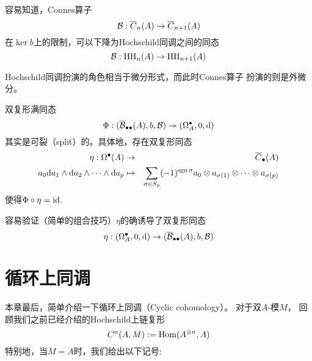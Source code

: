 











\begin{rem}
容易知道，Connes算子
$$\mathcal{B}:\overline{C}_n(A)\to\overline{C}_{n+1}(A)$$
在$\ker b$上的限制，可以下降为Hochschild同调之间的同态
$$\mathcal{B}:\operatorname{HH}_n(A)\to\operatorname{HH}_{n+1}(A)$$
\end{rem}
Hochschild同调扮演的角色相当于微分形式，而此时Connes算子
扮演的则是外微分。

\begin{rem}
双复形满同态
$$\Phi:(\overline{\mathcal{B}}_{\bullet\bullet}(A),b,\mathcal{B})\twoheadrightarrow
(\Omega^{\bullet}_A,0,\mathrm{d})
$$
其实是可裂（split）的。具体地，存在双复形同态
\begin{eqnarray*}
\eta:\Omega^{\bullet}(A)&\to&\overline{C}_{\bullet}(A)\\
a_0\mathrm{d} a_1\wedge\mathrm{d} a_2\wedge\cdots\wedge\mathrm{d} a_p
&\mapsto&\sum_{\sigma\in S_p}(-1)^{\operatorname{sgn} \sigma}
           a_0\otimes a_{\sigma(1)}\otimes\cdots\otimes a_{\sigma(p)}
\end{eqnarray*}
使得$\Phi\circ\eta=\operatorname{id}$.
\end{rem}

容易验证（简单的组合技巧）$\eta$的确诱导了双复形同态
$$\eta:(\Omega^{\bullet}_A,0,\mathrm{d})\to
(\overline{\mathcal{B}}_{\bullet\bullet}(A),b,\mathcal{B})
$$

\section{循环上同调}
本章最后，简单介绍一下循环上同调（Cyclic cohomology）。
对于双$A$-模$M$，
回顾我们之前已经介绍的Hochschild上链复形
$$C^n(A,M):=\operatorname{Hom}(A^{\otimes n},A)$$
特别地，当$M=A$时，我们给出以下记号:


